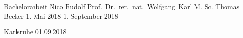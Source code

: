\documentclass[a4paper,titlepage,12pt,twoside,openright,abstracton,headsepline,halfparskip,final,BCOR1.0cm]{scrreprt}
\begin{document}
	\pagestyle{empty}

			{Bachelorarbeit}  %
			{Nico Rudolf}                %
			{Prof.~Dr.~rer.~nat.~Wolfgang~Karl}
			{M. Sc. Thomas Becker} %
			{1. Mai 2018}                               %
			{1. September 2018}                                 %

			{Karlsruhe}    %
			{01.09.2018}    %

	\cleardoublepage
	
% 	
	
	\cleardoublepage

	\pagestyle{scrheadings}

	\tableofcontents
	\listoftables
	\listoffigures
	\cleardoublepage

	\pagestyle{scrheadings}
     

	
	
	
	
	
	
%	


% 	


	

%  


	
\end{document}
